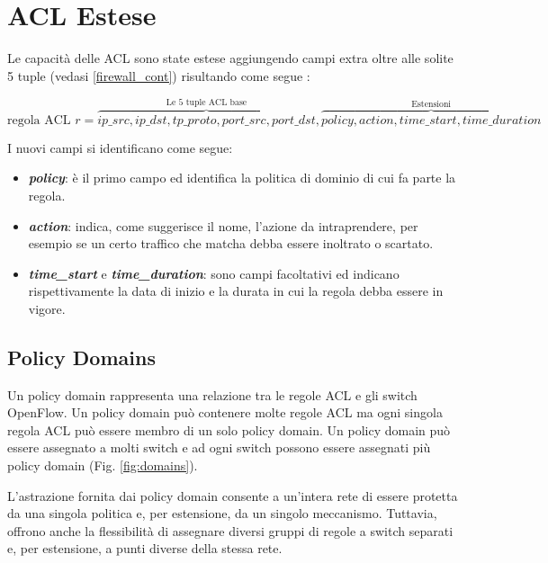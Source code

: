 \section{ACL Estese}

Le capacità delle ACL sono state estese aggiungendo campi extra oltre alle solite 5 tuple (vedasi \ref{firewall_cont}) risultando come segue \cite{bakker2016network}:

\[
  \text{regola ACL } r = \overbrace{
    ip\_src, ip\_dst, tp\_proto, port\_src, port\_dst
   }^\text{Le 5 tuple ACL base},
   \overbrace{
    policy, action, time\_start, time\_duration
   }^\text{Estensioni}
 \]

I nuovi campi si identificano come segue:
\begin{itemize}
  \item \textbf{\textit{policy}}: è il primo campo ed identifica la politica di dominio di cui fa parte la regola.
  \item \textbf{\textit{action}}: indica, come suggerisce il nome, l'azione da intraprendere, per esempio se un certo traffico che matcha debba essere inoltrato o scartato.
  \item \textbf{\textit{time\_start}} e \textbf{\textit{time\_duration}}: sono campi facoltativi ed indicano rispettivamente la data di inizio e la durata in cui la regola debba essere in vigore.
\end{itemize}

\subsection{Policy Domains}

Un policy domain rappresenta una relazione tra le regole ACL e gli switch OpenFlow. Un policy domain può contenere molte regole ACL ma ogni singola regola ACL può essere membro di un solo policy domain. Un policy domain può essere assegnato a molti switch e ad ogni switch possono essere assegnati più policy domain (Fig. \ref{fig:domains}).

L'astrazione fornita dai policy domain consente a un'intera rete di essere protetta da una singola politica e, per estensione, da un singolo meccanismo. Tuttavia, offrono anche la flessibilità di assegnare diversi gruppi di regole a switch separati e, per estensione, a punti diverse della stessa rete.

